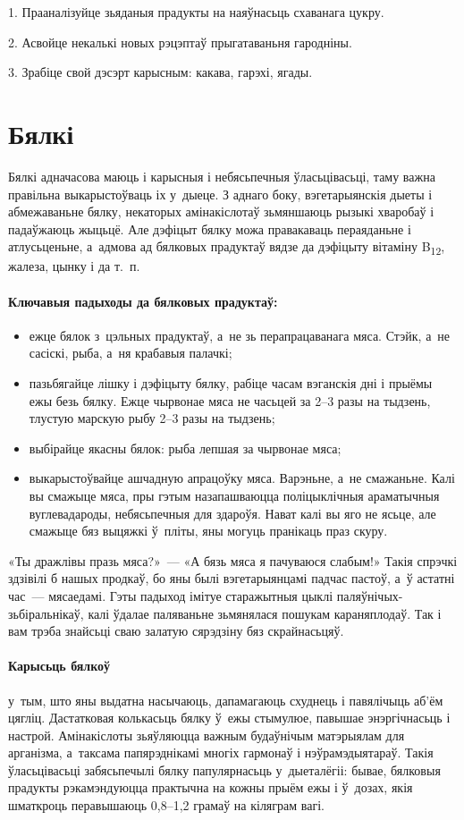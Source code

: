 1. Прааналізуйце зьяданыя прадукты на наяўнасьць схаванага цукру.

2. Асвойце некалькі новых рэцэптаў прыгатаваньня гародніны.

3. Зрабіце свой дэсэрт карысным: какава, гарэхі, ягады.


\section{Бялкі}

Бялкі адначасова маюць і карысныя і небясьпечныя ўласьцівасьці, таму важна правільна выкарыстоўваць іх у~дыеце. З аднаго боку, вэгетарыянскія дыеты і абмежаваньне бялку, некаторых амінакіслотаў зьмяншаюць рызыкі хваробаў і падаўжаюць жыцьцё. Але дэфіцыт бялку можа правакаваць пераяданьне і атлусьценьне, а~адмова ад бялковых прадуктаў вядзе да дэфіцыту вітаміну B\textsubscript{12}, жалеза, цынку і да т.~п.

\paragraph{Ключавыя падыходы да бялковых прадуктаў:}
\begin{itemize}
  \item ежце бялок з~цэльных прадуктаў, а~не зь перапрацаванага мяса. Стэйк, а~не сасіскі, рыба, а~ня крабавыя палачкі;
  \item пазьбягайце лішку і дэфіцыту бялку, рабіце часам вэганскія дні і прыёмы ежы безь бялку. Ежце чырвонае мяса не часьцей за 2--3 разы на тыдзень, тлустую марскую рыбу 2--3 разы на тыдзень;
  \item выбірайце якасны бялок: рыба лепшая за чырвонае мяса;
  \item выкарыстоўвайце ашчадную апрацоўку мяса. Варэньне, а~не смажаньне. Калі вы смажыце мяса, пры гэтым назапашваюцца поліцыклічныя араматычныя вуглевадароды, небясьпечныя для здароўя. Нават калі вы яго не ясьце, але смажыце бяз выцяжкі ў~пліты, яны могуць пранікаць праз скуру.
\end{itemize}

«Ты дражлівы празь мяса?»~--- «А бязь мяса я пачуваюся слабым!» Такія спрэчкі здзівілі б нашых продкаў, бо яны былі вэгетарыянцамі падчас пастоў, а~ў астатні час~--- мясаедамі. Гэты падыход імітуе старажытныя цыклі паляўнічых-зьбіральнікаў, калі ўдалае паляваньне зьмянялася пошукам караняплодаў. Так і вам трэба знайсьці сваю залатую сярэдзіну бяз скрайнасьцяў.

\paragraph{Карысьць бялкоў} у~тым, што яны выдатна насычаюць, дапамагаюць схуднець і павялічыць аб'ём цягліц. Дастатковая колькасьць бялку ў~ежы стымулюе, павышае энэргічнасьць і настрой. Амінакіслоты зьяўляюцца важным будаўнічым матэрыялам для арганізма, а~таксама папярэднікамі многіх гармонаў і нэўрамэдыятараў. Такія ўласьцівасьці забясьпечылі бялку папулярнасьць у~дыеталёгіі: бывае, бялковыя прадукты рэкамэндуюцца практычна на кожны прыём ежы і ў~дозах, якія шматкроць перавышаюць 0,8--1,2 грамаў на кіляграм вагі. 

